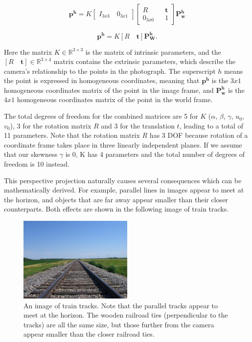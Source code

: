 \documentclass[]{article}
\begin{document}
\begin{equation}
\boldsymbol{p^h}
=
K \begin{bmatrix}
I_{3x3} \quad 0_{3x1}
\end{bmatrix}
\begin{bmatrix}
R && \boldsymbol{t} \\
0_{3x0} && 1
\end{bmatrix}
\boldsymbol{P_w^h}
\end{equation}

\begin{equation}
\boldsymbol{p^h} = K[R \quad \boldsymbol{t}] \boldsymbol{P_W^h}.
\end{equation}

Here the matrix $K \in \mathbb{R}^{3\times3}$ is the matrix of intrinsic parameters, and the $[R \quad \boldsymbol{t}] \in \mathbb{R}^{3\times4}$ matrix contains the extrinsic parameters, which describe the camera's relationship to the points in the photograph. The superscript $h$ means the point is expressed in homogeneous coordinates, meaning that $\boldsymbol{p^h}$ is the $3x1$ homogeneous coordinates matrix of the point in the image frame, and $\boldsymbol{P_w^h}$ is the $4x1$ homogeneous coordinates matrix of the point in the world frame.

The total degrees of freedom for the combined matrices are 5 for $K$ ($\alpha$, $\beta$, $\gamma$, $u_0$, $v_0$), 3 for the rotation matrix $R$ and 3 for the translation $t$, leading to a total of 11 parameters. Note that the rotation matrix $R$ has 3 DOF because rotation of a coordinate frame takes place in three linearly independent planes. If we assume that our skewness $\gamma$ is 0, K has 4 parameters and the total number of degrees of freedom is 10 instead.

This perspective projection naturally causes several consequences which can be mathematically derived. For example, parallel lines in images appear to meet at the horizon, and objects that are far away appear smaller than their closer counterparts. Both effects are shown in the following image of train tracks.

\begin{figure}[H]
	\includegraphics[width=0.5\textwidth]{traintracks.jpg}
	\centering
	\caption{An image of train tracks. Note that the parallel tracks appear to meet at the horizon. The wooden railroad ties (perpendicular to the tracks) are all the same size, but those further from the camera appear smaller than the closer railroad ties. }
	\label{fig:train_tracks}
\end{figure}
\end{document}

